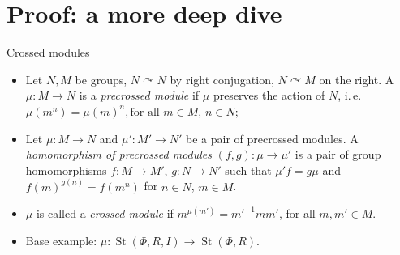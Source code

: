 \documentclass[handout]{beamer} %
\DeclareMathOperator{\St}{St}
\theoremstyle{definition}
\begin{document}
\section{Proof: a more deep dive}

\begin{frame} \tableofcontents[currentsection] \end{frame}

\begin{frame}{Crossed modules}
\begin{itemize}
\item Let $N, M$ be groups, $N \curvearrowright N$ by right conjugation, $N \curvearrowright M$ on the right.
A $\mu\colon M \to N$ is a \textit{precrossed module} if $\mu$ preserves the action of $N$, i.\,e.
\( \mu(m^n) = \mu(m)^n, \text{for all $m \in M$, $n\in N;$} \)
\pause

\item Let $\mu\colon M \to N$ and $\mu' \colon M' \to N'$ be a pair of precrossed modules.
A \textit{homomorphism of precrossed modules} $(f, g)\colon \mu \to \mu'$ is a pair of group homomorphisms
$f\colon M \to M'$, $g\colon N \to N'$ such that $\mu'f = g \mu$ and ${f(m)}^{g(n)} = f(m^n)$ for $n \in N$, $m \in M$.
\pause

\item $\mu$ is called a \textit{crossed module} if \({m}^{\mu(m')} = {m'}^{-1} m m'\), for all $m, m' \in M.$
\pause

\item Base example: $\mu \colon \St(\Phi, R, I) \to \St(\Phi, R)$.
\end{itemize}
\end{frame}
\end{document}
